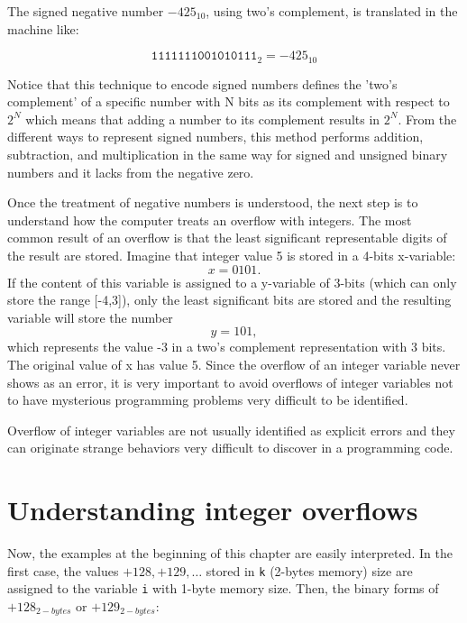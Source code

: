 The signed negative number $-425_{10}$, using two's complement, is translated in the machine like:

\begin{equation}
    \texttt{1111111001010111}_{2} = -425_{10}
\end{equation}

Notice that this technique to encode signed numbers defines the 'two's complement' of a specific number 
with N bits as its complement with respect to $2^N$ which means that adding a number to its complement 
results in $2^N$. From the different ways to represent signed numbers, this method performs addition, subtraction, and multiplication 
in the same way for signed and unsigned binary numbers and it lacks from the negative zero. 




Once the treatment of negative numbers is understood, the next step is to understand how the computer 
treats an overflow with integers.  
The most common result of an overflow is that the least significant representable digits 
of the result are stored. Imagine that integer value 5 is stored in a 4-bits x-variable:
$$
       x = 0101.
$$
If the content of this variable is assigned to a y-variable of 3-bits (which can only store the range [-4,3]),
only the least significant bits are stored and the 
resulting variable will store the number
$$
       y = 101,
$$
which represents the value -3 in a two's complement representation with 3 bits. The original value of x has value 5.  
Since the overflow of an integer variable never shows as an error, 
it is very important to avoid overflows of integer variables not to have mysterious 
programming problems very difficult to be identified. 


\begin{IN}
Overflow of integer variables are not usually identified as explicit errors and they 
can originate strange behaviors very difficult to discover in a programming code. 
\end{IN}




    \newpage 
    \section{Understanding integer overflows}  \label{sec:UndersIntOver}

Now, the examples at the beginning of this chapter are easily interpreted. In the first case, the 
values $+128, +129, \dots$ stored in \texttt{k} (2-bytes memory) size are assigned to the variable 
\texttt{i} with 1-byte memory size.
Then, the binary forms of $+128_{2-bytes}$ or $+129_{2-bytes}$:

